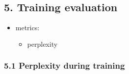 \documentclass[10pt]{article}
\providecommand{\tightlist}{%
      \setlength{\itemsep}{0pt}\setlength{\parskip}{0pt}}
\begin{document}
    \hypertarget{training-evaluation}{%
\subsection{5. Training evaluation}\label{training-evaluation}}

\begin{itemize}
\tightlist
\item
  metrics:

  \begin{itemize}
  \tightlist
  \item
    perplexity
  \end{itemize}
\end{itemize}

    \hypertarget{perplexity-during-training}{%
\subsubsection{5.1 Perplexity during
training}\label{perplexity-during-training}}
\end{document}
